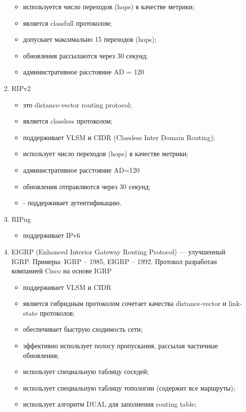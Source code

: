 \begin{enumerate}
\begin{itemize}
        \item используется число переходов (hops) в качестве метрики;
        \item является classfull протоколом;
        \item допускает максимально 15 переходов (hops);
        \item обновления рассылаются через 30 секунд;
        \item административное расстояние AD = 120
    \end{itemize}
    \item RIPv2
    \begin{itemize}
        \item это distance-vector routing protocol;
        \item является classless протоколом;
        \item поддерживает VLSM и CIDR (Classless Inter Domain Routing);
        \item использует число переходов (hops) в качестве метрики;
        \item административное расстояние AD=120
        \item обновления отправляются через 30 секунд;
        \item - поддерживает аутентификацию.
    \end{itemize}
    \item RIPng
    \begin{itemize}
        \item поддерживает IPv6
    \end{itemize}
    \item EIGRP (Enhanced Interior Gateway Routing Protocol)
    --- улучшенный IGRP. Примеры: IGRP – 1985, EIGRP – 1992.
    Протокол разработан компанией Cisco на основе IGRP
    \begin{itemize}
        \item поддерживает VLSM и CIDR
        \item является гибридным протоколом сочетает качества
        distance-vector и link-state протоколов;
        \item обеспечивает быструю сходимость сети;
        \item эффективно использует полосу пропускания,
        рассылая частичные обновления;
        \item использует специальную таблицу соседей;
        \item использует специальную таблицу топологии (содержит все маршруты);
        \item использует алгоритм DUAL для заполнения routing table;

\end{itemize}
\end{enumerate}
